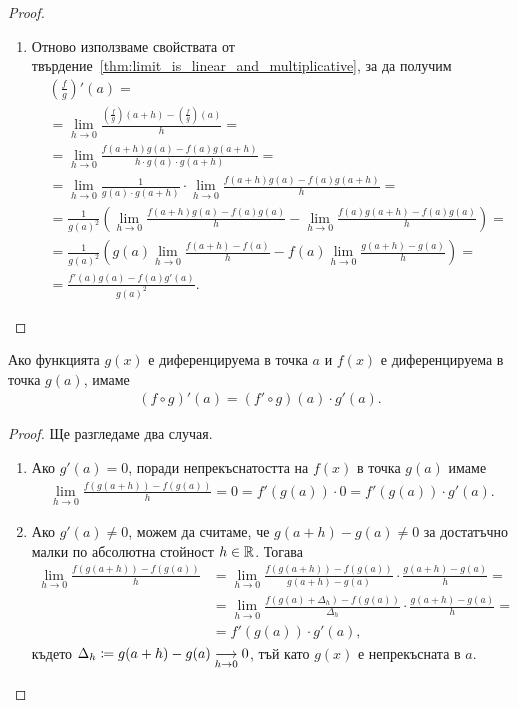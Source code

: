 \documentclass[numbers=endperiod, bibliography=totocnumbered]{scrartcl}
\begin{document}
\begin{proof}
\begin{enumerate}
    \item Отново използваме свойствата от твърдение~\ref{thm:limit_is_linear_and_multiplicative}, за да получим
    \begin{align*}
      &\left( \frac f g \right)'(a)
      = \\ &=
      \lim_{h \to 0} \frac {\left(\frac f g \right)(a+h) - \left(\frac f g \right)(a)} h
      = \\ &=
      \lim_{h \to 0} \frac {f(a+h) g(a) - f(a) g(a+h)} {h \cdot g(a) \cdot g(a+h)}
      = \\ &=
      \lim_{h \to 0} \frac 1 {g(a) \cdot g(a+h)} \cdot \lim_{h \to 0} \frac {f(a+h) g(a) - f(a) g(a+h)} h
      = \\ &=
      \frac 1 {{g(a)}^2} \left( \lim_{h \to 0} \frac {f(a+h) g(a) - f(a) g(a)} h - \lim_{h \to 0} \frac {f(a) g(a+h) - f(a) g(a)} h \right)
      = \\ &=
      \frac 1 {{g(a)}^2} \left( g(a) \lim_{h \to 0} \frac {f(a+h) - f(a)} h - f(a) \lim_{h \to 0} \frac {g(a+h) - g(a)} h \right)
      = \\ &=
      \frac {f'(a) g(a) - f(a) g'(a)} {{g(a)}^2}.
    \end{align*}
  \end{enumerate}
\end{proof}

\begin{theorem}\label{thm:chain_rule}
  Ако функцията \( g(x) \) е диференцируема в точка \( a \) и \( f(x) \) е диференцируема в точка \( g(a) \), имаме
  \begin{align*}
    (f \circ g)'(a) = (f' \circ g)(a) \cdot g'(a).
  \end{align*}
\end{theorem}
\begin{proof}
  Ще разгледаме два случая.

  \begin{enumerate}
    \item Ако \( g'(a) = 0 \), поради непрекъснатостта на \( f(x) \) в точка \( g(a) \) имаме
    \begin{align*}
      \lim_{h \to 0} \frac {f(g(a+h)) - f(g(a))} h
      =
      0
      =
      f'(g(a)) \cdot 0
      =
      f'(g(a)) \cdot g'(a).
    \end{align*}

    \item Ако \( g'(a) \neq 0 \), можем да считаме, че \( g(a+h) - g(a) \neq 0 \) за достатъчно малки по абсолютна стойност \( h \in \R \). Тогава
    \begin{align*}
      \lim_{h \to 0} \frac {f(g(a+h)) - f(g(a))} h
      &=
      \lim_{h \to 0} \frac {f(g(a+h)) - f(g(a))} {g(a+h) - g(a)} \cdot \frac {g(a+h) - g(a)} h
      = \\ &=
      \lim_{h \to 0} \frac {f(g(a) + \Delta_h) - f(g(a))} {\Delta_h} \cdot \frac {g(a+h) - g(a)} h
      = \\ &=
      f'(g(a)) \cdot g'(a),
    \end{align*}
    където \( \Delta_h \coloneqq g(a+h) - g(a) \Conv[h \to 0]{} 0 \), тъй като \( g(x) \) е непрекъсната в \( a \).
  \end{enumerate}
\end{proof}
\end{document}
